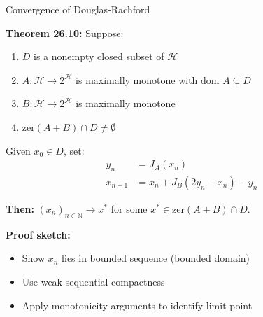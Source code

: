 \documentclass[aspectratio=169,10pt]{beamer}
\begin{document}
\begin{frame}{Convergence of Douglas-Rachford}

\textbf{Theorem 26.10:} Suppose:
\begin{enumerate}
  \item[(i)] $D$ is a nonempty closed subset of $\mathcal{H}$
  \item[(ii)] $A: \mathcal{H} \to 2^{\mathcal{H}}$ is maximally monotone with $\text{dom } A \subseteq D$
  \item[(iii)] $B: \mathcal{H} \to 2^{\mathcal{H}}$ is maximally monotone
  \item[(iv)] $\text{zer}(A + B) \cap D \neq \emptyset$
\end{enumerate}

Given $x_0 \in D$, set:
\begin{align*}
  y_n &= J_A(x_n) \\
  x_{n+1} &= x_n + J_B(2y_n - x_n) - y_n
\end{align*}

\textbf{Then:} $(x_n)_{n \in \mathbb{N}} \to x^*$ for some $x^* \in \text{zer}(A + B) \cap D$.

\vspace{0.3cm}
\textbf{Proof sketch:}
\begin{itemize}
  \item Show $x_n$ lies in bounded sequence (bounded domain)
  \item Use weak sequential compactness
  \item Apply monotonicity arguments to identify limit point
\end{itemize}

\end{frame}
\end{document}
